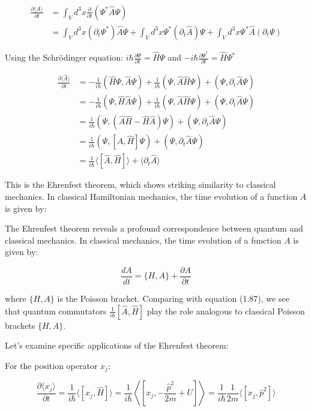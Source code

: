 \documentclass[italian]{HKNdocument}
\begin{document}
\begin{align*}
\frac{\partial\langle\hat{A}\rangle}{\partial t} &= \int_V d^3x\frac{\partial}{\partial t}(\Psi^*\hat{A}\Psi) \\
&= \int_V d^3x(\partial_t\Psi^*)\hat{A}\Psi + \int_V d^3x\Psi^*(\partial_t\hat{A})\Psi + \int_V d^3x\Psi^*\hat{A}(\partial_t\Psi) \tag{1.86}
\end{align*}

Using the Schrödinger equation:
$i\hbar\frac{\partial\Psi}{\partial t} = \hat{H}\Psi$ and $-i\hbar\frac{\partial\Psi^*}{\partial t} = \hat{H}\Psi^*$

\begin{align*}
\frac{\partial\langle\hat{A}\rangle}{\partial t} &= -\frac{1}{i\hbar}(\hat{H}\Psi, \hat{A}\Psi) + \frac{1}{i\hbar}(\Psi, \hat{A}\hat{H}\Psi) + (\Psi, \partial_t\hat{A}\Psi) \\
&= -\frac{1}{i\hbar}(\Psi, \hat{H}\hat{A}\Psi) + \frac{1}{i\hbar}(\Psi, \hat{A}\hat{H}\Psi) + (\Psi, \partial_t\hat{A}\Psi) \\
&= \frac{1}{i\hbar}(\Psi, (\hat{A}\hat{H} - \hat{H}\hat{A})\Psi) + (\Psi, \partial_t\hat{A}\Psi) \tag{1.87} \\
&= \frac{1}{i\hbar}(\Psi, [\hat{A}, \hat{H}]\Psi) + (\Psi, \partial_t\hat{A}\Psi) \\
&= \frac{1}{i\hbar}\langle[\hat{A}, \hat{H}]\rangle + \langle\partial_t\hat{A}\rangle
\end{align*}

This is the Ehrenfest theorem, which shows striking similarity to classical mechanics. In classical Hamiltonian mechanics, the time evolution of a function $A$ is given by:


The Ehrenfest theorem reveals a profound correspondence between quantum and classical mechanics. In classical mechanics, the time evolution of a function $A$ is given by:

\begin{equation*}
\frac{dA}{dt} = \{H,A\} + \frac{\partial A}{\partial t} \tag{1.88}
\end{equation*}

where $\{H,A\}$ is the Poisson bracket. Comparing with equation (1.87), we see that quantum commutators $\frac{1}{i\hbar}[\hat{A},\hat{H}]$ play the role analogous to classical Poisson brackets $\{H,A\}$.

Let's examine specific applications of the Ehrenfest theorem:

For the position operator $x_j$:

\begin{equation*}
\frac{\partial\langle x_j\rangle}{\partial t} = \frac{1}{i\hbar}\langle[x_j,\hat{H}]\rangle = \frac{1}{i\hbar}\left\langle\left[x_j,-\frac{\hat{p}^2}{2m}+U\right]\right\rangle = \frac{1}{i\hbar}\frac{1}{2m}\langle[x_j,\hat{p}^2]\rangle \tag{1.89}
\end{equation*}
\end{document}

